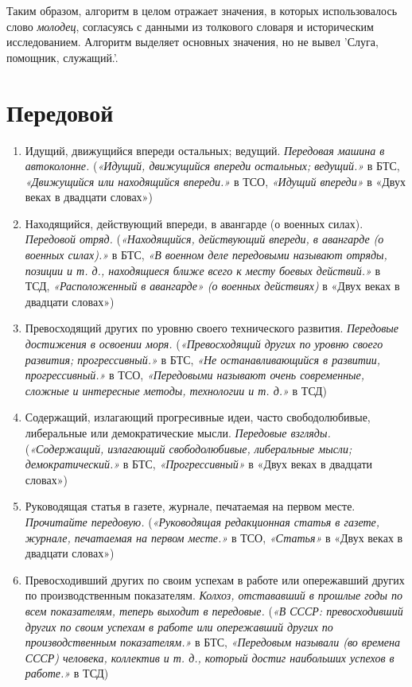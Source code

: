 Таким образом, алгоритм в целом отражает значения, в которых использовалось
слово \textit{молодец}, согласуясь с данными из толкового словаря и историческим исследованием.
Алгоритм выделяет основных значения, но не вывел ’Слуга, помощник, служащий.’.

\section*{Передовой}

\begin{enumerate}
    \item Идущий, движущийся впереди остальных; ведущий. \textit{Передовая машина в автоколонне.}
(\textit{«Идущий, движущийся впереди остальных; ведущий.»} в БТС,
\textit{«Движущийся или находящийся впереди.»} в ТСО,
\textit{«Идущий впереди»} в «Двух веках в двадцати словах»)

    \item Находящийся, действующий впереди, в авангарде (о военных силах). \textit{Передовой отряд.}
(\textit{«Находящийся, действующий впереди, в авангарде (о военных силах).»} в БТС,
\textit{«В военном деле передовыми называют отряды, позиции и т. д., находящиеся ближе всего к месту боевых действий.»} в ТСД,
\textit{«Расположенный в авангарде» (о военных действиях)} в «Двух веках в двадцати словах»)

    \item Превосходящий других по уровню своего технического развития. \textit{Передовые достижения в освоении моря.}
(\textit{«Превосходящий других по уровню своего развития; прогрессивный.»} в БТС,
\textit{«Не останавливающийся в развитии, прогрессивный.»} в ТСО,
\textit{«Передовыми называют очень современные, сложные и интересные методы, технологии и т. д.»} в ТСД)

    \item Содержащий, излагающий прогресивные идеи, часто свободолюбивые, либеральные или демократические мысли. \textit{Передовые взгляды.}
(\textit{«Содержащий, излагающий свободолюбивые, либеральные мысли; демократический.»} в БТС,
\textit{«Прогрессивный»} в «Двух веках в двадцати словах»)

    \item Руководящая статья в газете, журнале, печатаемая на первом месте. \textit{Прочитайте передовую.}
(\textit{«Руководящая редакционная статья в газете, журнале, печатаемая на первом месте.»} в ТСО,
\textit{«Статья»} в «Двух веках в двадцати словах»)

    \item Превосходивший других по своим успехам в работе или опережавший других по производственным показателям. \textit{Колхоз, отстававший в прошлые годы по всем показателям, теперь выходит в передовые.}
(\textit{«В СССР: превосходивший других по своим успехам в работе или опережавший других по производственным показателям.»} в БТС,
\textit{«Передовым называли (во времена СССР) человека, коллектив и т. д., который достиг наибольших успехов в работе.»} в ТСД)


\end{enumerate}
